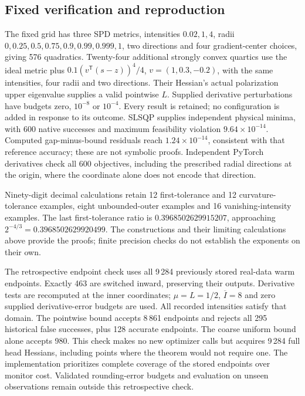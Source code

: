 \subsection{Fixed verification and reproduction}
The fixed grid has three SPD metrics, intensities $0.02,1,4$, radii $0,0.25,0.5,0.75,0.9,0.99,0.999,1$, two directions and four gradient-center choices, giving 576 quadratics. Twenty-four additional strongly convex quartics use the ideal metric plus $0.1(v^{\mathsf T}(s-z))^4/4$, $v=(1,0.3,-0.2)$, with the same intensities, four radii and two directions. Their Hessian's actual polarization upper eigenvalue supplies a valid pointwise $L$. Supplied derivative perturbations have budgets zero, $10^{-8}$ or $10^{-4}$. Every result is retained; no configuration is added in response to its outcome. SLSQP supplies independent physical minima, with 600 native successes and maximum feasibility violation $9.64\times10^{-14}$. Computed gap-minus-bound residuals reach $1.24\times10^{-14}$, consistent with that reference accuracy; these are not symbolic proofs. Independent PyTorch derivatives check all 600 objectives, including the prescribed radial directions at the origin, where the coordinate alone does not encode that direction.

Ninety-digit decimal calculations retain 12 first-tolerance and 12 curvature-tolerance examples, eight unbounded-outer examples and 16 vanishing-intensity examples. The last first-tolerance ratio is $0.3968502629915207$, approaching $2^{-4/3}=0.3968502629920499$. The constructions and their limiting calculations above provide the proofs; finite precision checks do not establish the exponents on their own.

The retrospective endpoint check uses all 9\,284 previously stored real-data warm endpoints. Exactly 463 are switched inward, preserving their outputs. Derivative tests are recomputed at the inner coordinates; $\mu=L=1/2$, $\overline I=8$ and zero supplied derivative-error budgets are used. All recorded intensities satisfy that domain. The pointwise bound accepts 8\,861 endpoints and rejects all 295 historical false successes, plus 128 accurate endpoints. The coarse uniform bound alone accepts 980. This check makes no new optimizer calls but acquires 9\,284 full head Hessians, including points where the theorem would not require one. The implementation prioritizes complete coverage of the stored endpoints over monitor cost. Validated rounding-error budgets and evaluation on unseen observations remain outside this retrospective check.

